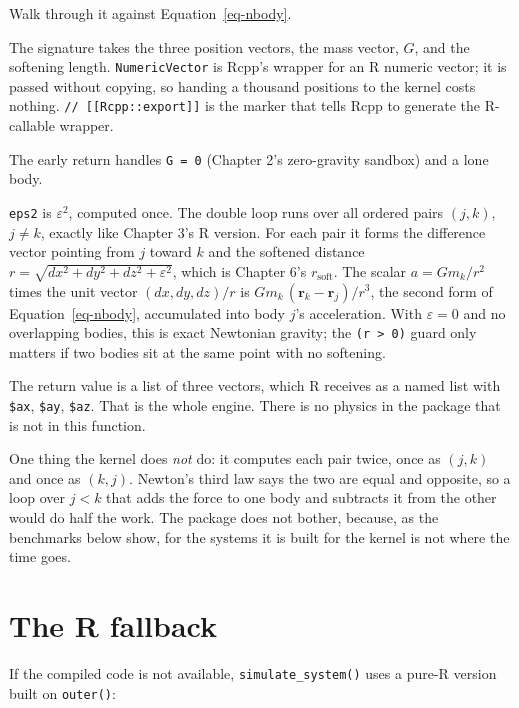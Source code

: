 \documentclass[
  10.5pt,
  letterpaper,
]{scrbook}
\theoremstyle{definition}
\theoremstyle{plain}
\theoremstyle{remark}
\begin{document}
Walk through it against Equation~\ref{eq-nbody}.

The signature takes the three position vectors, the mass vector, \(G\),
and the softening length. \texttt{NumericVector} is Rcpp's wrapper for
an R numeric vector; it is passed without copying, so handing a thousand
positions to the kernel costs nothing.
\texttt{//\ {[}{[}Rcpp::export{]}{]}} is the marker that tells Rcpp to
generate the R-callable wrapper.

The early return handles \texttt{G\ =\ 0} (Chapter 2's zero-gravity
sandbox) and a lone body.

\texttt{eps2} is \(\varepsilon^2\), computed once. The double loop runs
over all ordered pairs \((j, k)\), \(j \ne k\), exactly like Chapter 3's
R version. For each pair it forms the difference vector pointing from
\(j\) toward \(k\) and the softened distance
\(r = \sqrt{dx^2 + dy^2 + dz^2 + \varepsilon^2}\), which is Chapter 6's
\(r_{\mathrm{soft}}\). The scalar \(a = Gm_k/r^2\) times the unit vector
\((dx, dy, dz)/r\) is \(Gm_k\,(\mathbf{r}_k - \mathbf{r}_j)/r^3\), the
second form of Equation~\ref{eq-nbody}, accumulated into body \(j\)'s
acceleration. With \(\varepsilon = 0\) and no overlapping bodies, this
is exact Newtonian gravity; the \texttt{(r\ \textgreater{}\ 0)} guard
only matters if two bodies sit at the same point with no softening.

The return value is a list of three vectors, which R receives as a named
list with \texttt{\$ax}, \texttt{\$ay}, \texttt{\$az}. That is the whole
engine. There is no physics in the package that is not in this function.

One thing the kernel does \emph{not} do: it computes each pair twice,
once as \((j,k)\) and once as \((k,j)\). Newton's third law says the two
are equal and opposite, so a loop over \(j < k\) that adds the force to
one body and subtracts it from the other would do half the work. The
package does not bother, because, as the benchmarks below show, for the
systems it is built for the kernel is not where the time goes.

\section{The R fallback}\label{the-r-fallback}

If the compiled code is not available, \texttt{simulate\_system()} uses
a pure-R version built on \texttt{outer()}:
\end{document}
